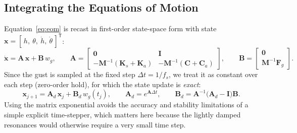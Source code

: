 \documentclass[11pt]{article}
\begin{document}
\subsection{Integrating the Equations of Motion}
Equation~\eqref{eq:eom} is recast in first-order state-space form with state
$\mathbf x=[\,h,\ \theta,\ \dot h,\ \dot\theta\,]^{\mathsf T}$:
\begin{equation}
\dot{\mathbf x}=\mathbf A\,\mathbf x+\mathbf B\,w_g,\qquad
\mathbf A=\begin{bmatrix}\mathbf 0 & \mathbf I\\[2pt]
-\mathbf M^{-1}(\mathbf K_s+\mathbf K_a) & -\mathbf M^{-1}(\mathbf C+\mathbf C_a)\end{bmatrix},\qquad
\mathbf B=\begin{bmatrix}\mathbf 0\\[2pt]\mathbf M^{-1}\mathbf F_g\end{bmatrix}.
\label{eq:ss}
\end{equation}
Since the gust is sampled at the fixed step $\Delta t=1/f_s$, we treat it as constant over
each step (zero-order hold), for which the state update is \emph{exact}:
\begin{equation}
\mathbf x_{j+1}=\mathbf A_d\,\mathbf x_j+\mathbf B_d\,w_g(t_j),\qquad
\mathbf A_d=e^{\mathbf A\Delta t},\qquad
\mathbf B_d=\mathbf A^{-1}\!\big(\mathbf A_d-\mathbf I\big)\mathbf B.
\label{eq:zoh}
\end{equation}
Using the matrix exponential avoids the accuracy and stability limitations of a simple
explicit time-stepper, which matters here because the lightly damped resonances would
otherwise require a very small time step.
\end{document}
